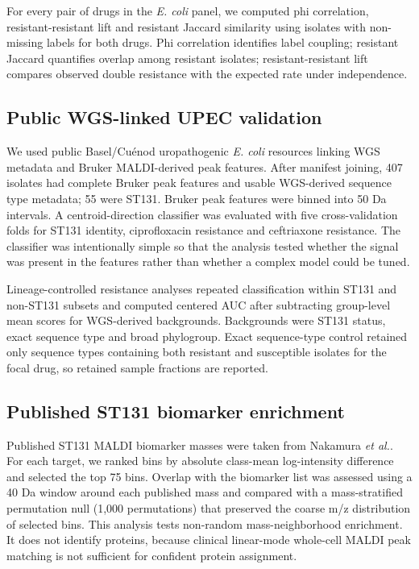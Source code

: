 \documentclass[11pt]{article}
\begin{document}
For every pair of drugs in the \textit{E. coli} panel, we computed phi correlation, resistant-resistant lift and resistant Jaccard similarity using isolates with non-missing labels for both drugs. Phi correlation identifies label coupling; resistant Jaccard quantifies overlap among resistant isolates; resistant-resistant lift compares observed double resistance with the expected rate under independence.

\subsection*{Public WGS-linked UPEC validation}

We used public Basel/Cu\'{e}nod uropathogenic \textit{E. coli} resources linking WGS metadata and Bruker MALDI-derived peak features\cite{cuenod2023papgii}. After manifest joining, 407 isolates had complete Bruker peak features and usable WGS-derived sequence type metadata; 55 were ST131. Bruker peak features were binned into 50 Da intervals. A centroid-direction classifier was evaluated with five cross-validation folds for ST131 identity, ciprofloxacin resistance and ceftriaxone resistance. The classifier was intentionally simple so that the analysis tested whether the signal was present in the features rather than whether a complex model could be tuned.

Lineage-controlled resistance analyses repeated classification within ST131 and non-ST131 subsets and computed centered AUC after subtracting group-level mean scores for WGS-derived backgrounds. Backgrounds were ST131 status, exact sequence type and broad phylogroup. Exact sequence-type control retained only sequence types containing both resistant and susceptible isolates for the focal drug, so retained sample fractions are reported.

\subsection*{Published ST131 biomarker enrichment}

Published ST131 MALDI biomarker masses were taken from Nakamura \textit{et al.}\cite{nakamura2019st131}. For each target, we ranked bins by absolute class-mean log-intensity difference and selected the top 75 bins. Overlap with the biomarker list was assessed using a 40 Da window around each published mass and compared with a mass-stratified permutation null (1,000 permutations) that preserved the coarse m/z distribution of selected bins. This analysis tests non-random mass-neighborhood enrichment. It does not identify proteins, because clinical linear-mode whole-cell MALDI peak matching is not sufficient for confident protein assignment.
\end{document}
